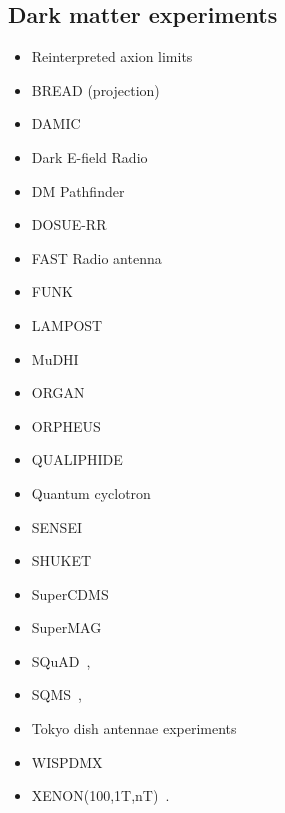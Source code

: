 \documentclass[10pt,twocolumn]{extarticle}
\begin{document}
\begin{mdframed}
\subsection*{Dark matter experiments}\vspace{-0.5em}
\begin{itemize}\setlength\itemsep{-0.5em}
\item Reinterpreted axion limits~\cite{Caputo:2021eaa}
\item BREAD (projection)~\cite{Liu:2021pei}
\item DAMIC~\cite{Aguilar-Arevalo:2019wdi}
\item Dark E-field Radio~\cite{Godfrey:2021tvs}
\item DM Pathfinder~\cite{Phipps:2019cqy}
\item DOSUE-RR~\cite{DOSUE-RR:2022ise}
 \item FAST Radio antenna~\cite{An:2022hhb}
\item FUNK~\cite{Andrianavalomahefa:2020ucg}
\item LAMPOST~\cite{Chiles:2021gxk}
\item MuDHI~\cite{Manenti:2021whp}
\item ORGAN~\cite{McAllister:2022ibe}
\item ORPHEUS~\cite{Cervantes:2022yzp}
\item QUALIPHIDE~\cite{Ramanathan:2022egk}
\item Quantum cyclotron~\cite{Fan:2022uwu}
\item SENSEI~\cite{Barak:2020fql}
\item SHUKET~\cite{Brun:2019kak}
\item SuperCDMS~\cite{Aralis:2019nfa}
\item SuperMAG~\cite{Fedderke:2021rrm,Fedderke:2021aqo}
\item SQuAD~\cite{Dixit:2020ymh},
\item SQMS~\cite{Cervantes:2022gtv},
\item Tokyo dish antennae experiments~\cite{Suzuki:2015sza,Knirck:2018ojz,Tomita:2020usq}
\item  WISPDMX~\cite{Nguyen:2019xuh}
\item  XENON(100,1T,nT)~\cite{Bloch:2016sjj,Aprile:2019xxb,Aprile:2020tmw, Bloch:2020uzh,XENON:2021myl,An:2020bxd}. 
\end{itemize}
\end{mdframed}


\onecolumn{


}
\end{document}
